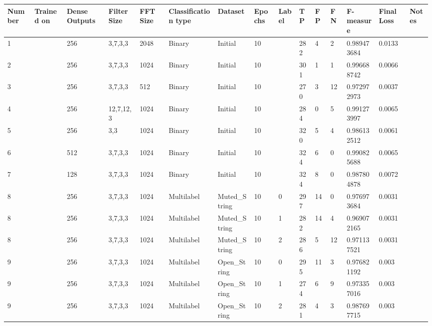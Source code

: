 \documentclass[conference]{IEEEtran}
\begin{document}
\begin{table}[!ht]
     \centering
     \begin{adjustbox}{width=\textwidth}
        \begin{tabular}{|l|l|l|l|l|l|l|l|l|l|l|l|l|l|l|}
            \hline
                Number & Trained on & Dense Outputs & Filter Size & FFT Size & Classification type & Dataset & Epochs & Label & TP & FP & FN & F-measure & Final Loss & Notes \\ \hline
                1 & ~ & 256 & 3,7,3,3 & 2048 & Binary & Initial & 10 & ~ & 282 & 4 & 2 & 0.989473684 & 0.0133 & ~ \\ \hline
                2 & ~ & 256 & 3,7,3,3 & 1024 & Binary & Initial & 10 & ~ & 301 & 1 & 1 & 0.996688742 & 0.0066 & ~ \\ \hline
                3 & ~ & 256 & 3,7,3,3 & 512 & Binary & Initial & 10 & ~ & 270 & 3 & 12 & 0.972972973 & 0.0037 & ~ \\ \hline
                4 & ~ & 256 & 12,7,12,3 & 1024 & Binary & Initial & 10 & ~ & 284 & 0 & 5 & 0.991273997 & 0.0065 & ~ \\ \hline
                5 & ~ & 256 & 3,3 & 1024 & Binary & Initial & 10 & ~ & 320 & 5 & 4 & 0.986132512 & 0.0061 & ~ \\ \hline
                6 & ~ & 512 & 3,7,3,3 & 1024 & Binary & Initial & 10 & ~ & 324 & 6 & 0 & 0.990825688 & 0.0065 & ~ \\ \hline
                7 & ~ & 128 & 3,7,3,3 & 1024 & Binary & Initial & 10 & ~ & 324 & 8 & 0 & 0.987804878 & 0.0072 & ~ \\ \hline
                8 & ~ & 256 & 3,7,3,3 & 1024 & Multilabel & Muted\_String & 10 & 0 & 297 & 14 & 0 & 0.976973684 & 0.0031 & ~ \\ \hline
                8 & ~ & 256 & 3,7,3,3 & 1024 & Multilabel & Muted\_String & 10 & 1 & 282 & 14 & 4 & 0.969072165 & 0.0031 & ~ \\ \hline
                8 & ~ & 256 & 3,7,3,3 & 1024 & Multilabel & Muted\_String & 10 & 2 & 286 & 5 & 12 & 0.971137521 & 0.0031 & ~ \\ \hline
                9 & ~ & 256 & 3,7,3,3 & 1024 & Multilabel & Open\_String & 10 & 0 & 295 & 11 & 3 & 0.976821192 & 0.003 & ~ \\ \hline
                9 & ~ & 256 & 3,7,3,3 & 1024 & Multilabel & Open\_String & 10 & 1 & 274 & 6 & 9 & 0.973357016 & 0.003 & ~ \\ \hline
                9 & ~ & 256 & 3,7,3,3 & 1024 & Multilabel & Open\_String & 10 & 2 & 281 & 4 & 3 & 0.987697715 & 0.003 & ~ \\ \hline

\end{tabular}
\end{adjustbox}
\end{table}
\end{document}
